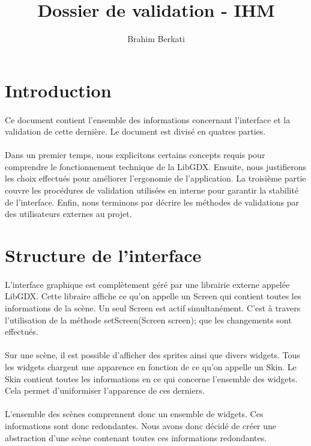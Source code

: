 \documentclass[11pt]{article} %
\title{Dossier de validation - IHM}
\author{Brahim Berkati}
\begin{document}
\maketitle

\section{Introduction}
\paragraph{}
Ce document contient l'ensemble des informations concernant l'interface et la validation de cette dernière. Le document est divisé en quatres parties.
\paragraph{}
Dans un premier temps, nous explicitons certains concepts requis pour comprendre le fonctionnement technique de la LibGDX. Ensuite, nous justifierons les choix effectués pour améliorer l'ergonomie de l'application. La troisième partie couvre les procédures de validation utilisées en interne pour garantir la stabilité de l'interface. Enfin, nous terminons par décrire les méthodes de validations par des utilisateurs externes au projet.

\section{Structure de l'interface}
\paragraph{}
L'interface graphique est complètement géré par une librairie externe appelée LibGDX. Cette libraire affiche ce qu'on appelle un Screen qui contient toutes les informations de la scène. Un seul Screen est actif simultanément. C'est à travers l'utilisation de la méthode setScreen(Screen screen); que les changements sont effectués.
\paragraph{}
Sur une scène, il est possible d'afficher des sprites ainsi que divers widgets. Tous les widgets chargent une apparence en fonction de ce qu'on appelle un Skin. Le Skin contient toutes les informations en ce qui concerne l'ensemble des widgets. Cela permet d'uniformiser l'apparence de ces derniers.
\paragraph{}
L'ensemble des scènes comprennent donc un ensemble de widgets. Ces informations sont donc redondantes. Nous avons donc décidé de créer une abstraction d'une scène contenant toutes ces informations redondantes.
\end{document}
